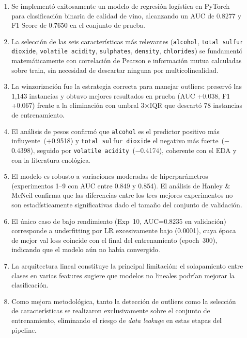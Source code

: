 \documentclass[conference]{IEEEtran}
\begin{document}
\begin{enumerate}
  \item Se implement\'{o} exitosamente un modelo de regresi\'{o}n log\'{i}stica en PyTorch para clasificaci\'{o}n binaria de calidad de vino, alcanzando un AUC de 0.8277 y F1-Score de 0.7650 en el conjunto de prueba.
  \item La selecci\'{o}n de las seis caracter\'{i}sticas m\'{a}s relevantes (\texttt{alcohol}, \texttt{total sulfur dioxide}, \texttt{volatile acidity}, \texttt{sulphates}, \texttt{density}, \texttt{chlorides}) se fundament\'{o} matem\'{a}ticamente con correlaci\'{o}n de Pearson e informaci\'{o}n mutua calculadas sobre train, sin necesidad de descartar ninguna por multicolinealidad.
  \item La winzorizaci\'{o}n fue la estrategia correcta para manejar outliers: preserv\'{o} las 1{,}143 instancias y obtuvo mejores resultados en prueba (AUC +0.038, F1 +0.067) frente a la eliminaci\'{o}n con umbral 3$\times$IQR que descart\'{o} 78 instancias de entrenamiento.
  \item El an\'{a}lisis de pesos confirm\'{o} que \texttt{alcohol} es el predictor positivo m\'{a}s influyente~(+0.9518) y \texttt{total sulfur dioxide} el negativo m\'{a}s fuerte~($-$0.4398), seguido por \texttt{volatile acidity}~($-$0.4174), coherente con el EDA y con la literatura enol\'{o}gica.
  \item El modelo es robusto a variaciones moderadas de hiperpar\'{a}metros (experimentos 1--9 con AUC entre 0.849 y 0.854). El an\'{a}lisis de Hanley \& McNeil confirma que las diferencias entre los tres mejores experimentos no son estad\'{i}sticamente significativas dado el tama\~{n}o del conjunto de validaci\'{o}n.
  \item El \'{u}nico caso de bajo rendimiento (Exp~10, AUC=0.8235 en validaci\'{o}n) corresponde a underfitting por LR excesivamente bajo (0.0001), cuya \'{e}poca de mejor val loss coincide con el final del entrenamiento (epoch~300), indicando que el modelo a\'{u}n no hab\'{i}a convergido.
  \item La arquitectura lineal constituye la principal limitaci\'{o}n: el solapamiento entre clases en varias features sugiere que modelos no lineales podr\'{i}an mejorar la clasificaci\'{o}n.
  \item Como mejora metodol\'{o}gica, tanto la detecci\'{o}n de outliers como la selecci\'{o}n de caracter\'{i}sticas se realizaron exclusivamente sobre el conjunto de entrenamiento, eliminando el riesgo de \textit{data leakage} en estas etapas del pipeline.
\end{enumerate}
\end{document}
